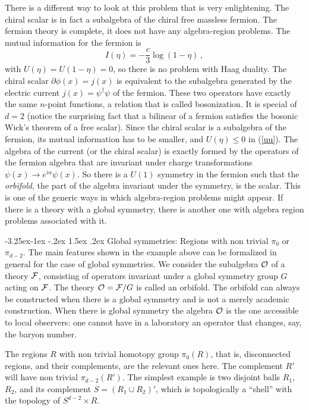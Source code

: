 \documentclass[11pt]{article}
\makeatletter
\renewcommand\subsection{\@startsection{subsection}{2}{\z@}%
                                   {-3.25ex\@plus -1ex \@minus -.2ex}%
                                     {1.5ex \@plus .2ex}%
                                     {\normalfont\bfseries}}
\numberwithin{equation}{section}
\newcommand{\be}{\begin{equation}}
\newcommand{\ee}{\end{equation}}
\makeatother
\begin{document}
There is a different way to look at this problem that is very enlightening. The chiral scalar is in fact a subalgebra of the chiral free massless fermion. The fermion theory is complete, it does not have any algebra-region problems. The mutual information for the fermion is
\be
I(\eta)=-\frac{c}{3} \log(1-\eta)\,,
\ee
with $U(\eta)=U(1-\eta)=0$, so there is no problem with Haag duality. 
The chiral scalar $\partial \phi(x)=j(x)$ is equivalent to the subalgebra generated by the electric current $j(x)=\psi^\dagger\psi$ of the fermion. These two operators have exactly the same $n$-point functions, a relation that is called bosonization. It is special of $d=2$ (notice the surprising fact that a bilinear of a fermion satisfies the bosonic Wick's theorem of a free scalar). Since the chiral scalar is a subalgebra of the fermion, its mutual information has to be smaller, and $U(\eta)\le 0$ in (\ref{uu}).
 The algebra of the current (or the chiral scalar) is exactly formed by the operators of the fermion algebra that are invariant under charge transformations $\psi(x)\rightarrow e^{i\alpha} \psi(x)$. So there is a $U(1)$ symmetry in the fermion such that the {\sl orbifold}, the part of the algebra invariant under the symmetry, is the scalar. This is one of the generic ways in which algebra-region problems might appear. If there is a theory with a global symmetry, there is another one with algebra region problems associated with it.   



\subsection{Global symmetries: Regions with non trivial $\pi_0$ or $\pi_{d-2}$.}
\label{global}
The main features shown in the example above can be formalized in general for the case of global symmetries. 
We consider the subalgebra ${\cal O}$ of a theory ${\cal F}$, consisting of operators invariant under a global symmetry group $G$ acting on ${\cal F}$. The theory ${\cal O}={\cal F}/G$ is called an orbifold. The orbifold can always be constructed when there is a global symmetry and is not a merely academic construction. When there is global symmetry the algebra ${\cal O}$ is the one accessible to local observers: one cannot have in a laboratory an operator that changes, say, the baryon number.     

The regions $R$ with non trivial homotopy group $\pi_0(R)$, that is, disconnected regions, and their complements,  are the relevant ones here. The complement $R'$ will have non trivial $\pi_{d-2}(R')$.  The simplest example is two disjoint balls $R_1$, $R_2$, and its complement $S=(R_1\cup R_2)'$, which is topologically a ``shell'' with the topology of $S^{d-2}\times R$. 
\end{document}
